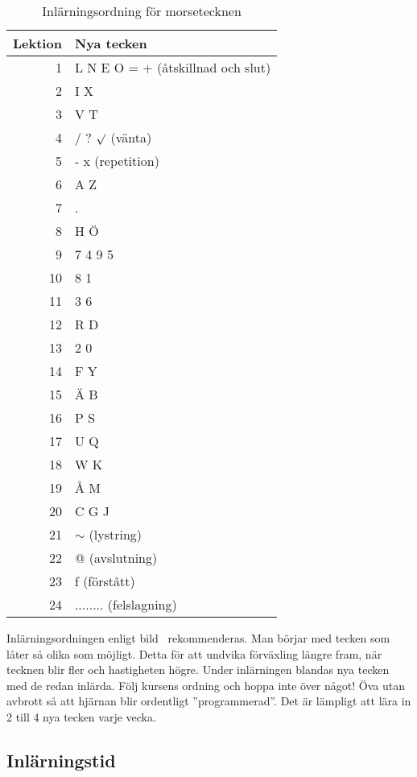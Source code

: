 \begin{table}[ht]
  \centering
   \begin{tabular}{|r|l|}
  	\hline
  	\textbf{Lektion} & \textbf{Nya tecken} \\ \hline
  	1 & L N E O = + (åtskillnad och slut) \\
  	2 & I X \\
  	3 & V T \\
  	4 & / ? $\surd$ (vänta) \\
  	5 & - x (repetition) \\
  	6 & A Z \\
  	7 & . \\
  	8 & H Ö \\
  	9 & 7 4 9 5 \\
  	10 & 8 1 \\
  	11 & 3 6 \\
  	12 & R D \\
  	13 & 2 0 \\
  	14 & F Y \\
  	15 & Ä B \\
  	16 & P S \\
  	17 & U Q \\
  	18 & W K \\
  	19 & Å M \\
  	20 & C G J \\
  	21 & $\sim$ (lystring) \\
  	22 & @ (avslutning) \\
  	23 & f (förstått) \\
  	24 & ........ (felslagning) \\
  	\hline
  \end{tabular}
  \caption{Inlärningsordning för morsetecknen}
  \label{fig:morse_ordning}
\end{table}

Inlärningsordningen enligt bild~ rekommenderas.
Man börjar med tecken som låter så olika som möjligt.
Detta för att undvika förväxling längre fram, när tecknen blir fler och
hastigheten högre.
Under inlärningen blandas nya tecken med de redan inlärda.
Följ kursens ordning och hoppa inte över något!
Öva utan avbrott så att hjärnan blir ordentligt ''programmerad''.
Det är lämpligt att lära in 2 till 4 nya tecken varje vecka.

\subsection{Inlärningstid}

